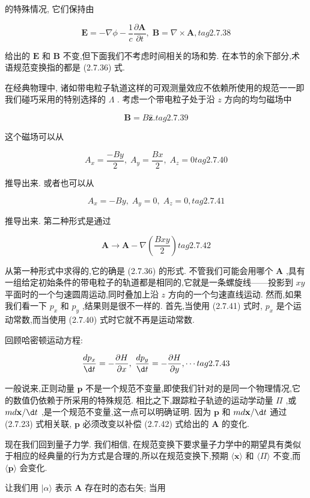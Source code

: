 \documentclass[lang=cn,newtx,10pt,scheme=chinese,thmcnt=section]{elegantbook}
\begin{document}
的特殊情况, 它们保持由

$$
\mathbf{E} = - \nabla \phi - \frac{1}{c}\frac{\partial \mathbf{A}}{\partial t},\;\mathbf{B} = \nabla \times \mathbf{A}, tag{2. 7.38}
$$

给出的 $\mathbf{E}$ 和 $\mathbf{B}$ 不变,但下面我们不考虑时间相关的场和势. 在本节的余下部分,术语规范变换指的都是 (2.7.36) 式.

在经典物理中, 诸如带电粒子轨道这样的可观测量效应不依赖所使用的规范一一即我们碰巧采用的特别选择的 $\Lambda$ . 考虑一个带电粒子处于沿 $z$ 方向的均匀磁场中

$$
\mathbf{B} = B\widehat{\mathbf{z}}\text{.} tag{2. 7.39}
$$

这个磁场可以从

$$
{A}_{x} = \frac{-{By}}{2},\;{A}_{y} = \frac{Bx}{2},\;{A}_{z} = 0 tag{2. 7.40}
$$

推导出来. 或者也可以从

$$
{A}_{x} = - {By},\;{A}_{y} = 0,\;{A}_{z} = 0, tag{2. 7.41}
$$

推导出来. 第二种形式是通过

$$
\mathbf{A} \rightarrow \mathbf{A} - \nabla \left( \frac{Bxy}{2}\right) tag{2. 7.42}
$$

从第一种形式中求得的,它的确是 (2.7.36) 的形式. 不管我们可能会用哪个 $\mathbf{A}$ ,具有一组给定初始条件的带电粒子的轨道都是相同的,它就是一条螺旋线——投影到 ${xy}$ 平面时的一个匀速圆周运动,同时叠加上沿 $z$ 方向的一个匀速直线运动. 然而,如果我们看一下 ${p}_{x}$ 和 ${p}_{y}$ ,结果则是很不一样的. 首先,当使用 (2.7.41) 式时, ${p}_{x}$ 是个运动常数,而当使用 (2.7.40) 式时它就不再是运动常数.

回顾哈密顿运动方程:

$$
\frac{d{p}_{x}}{\d t} = - \frac{\partial H}{\partial x},\;\frac{d{p}_{y}}{\d t} = - \frac{\partial H}{\partial y},\cdots tag{2. 7.43}
$$

一般说来,正则动量 $\mathbf{p}$ 不是一个规范不变量,即使我们针对的是同一个物理情况,它的数值仍依赖于所采用的特殊规范. 相比之下,跟踪粒子轨迹的运动学动量 $\Pi$ ,或 ${md}\mathbf{x}/{\d t}$ ,是一个规范不变量,这一点可以明确证明. 因为 $\mathbf{p}$ 和 ${md}\mathbf{x}/{\d t}$ 通过 (2.7.23) 式相关联, $\mathbf{p}$ 必须改变以补偿 (2.7.42) 式给出的 $\mathbf{A}$ 的变化.

现在我们回到量子力学. 我们相信, 在规范变换下要求量子力学中的期望具有类似于相应的经典量的行为方式是合理的,所以在规范变换下,预期 $\langle \mathbf{x}\rangle$ 和 $\langle \Pi \rangle$ 不变,而 $\langle \mathbf{p}\rangle$ 会变化.

让我们用 $|\alpha \rangle$ 表示 $\mathbf{A}$ 存在时的态右矢; 当用
\end{document}

